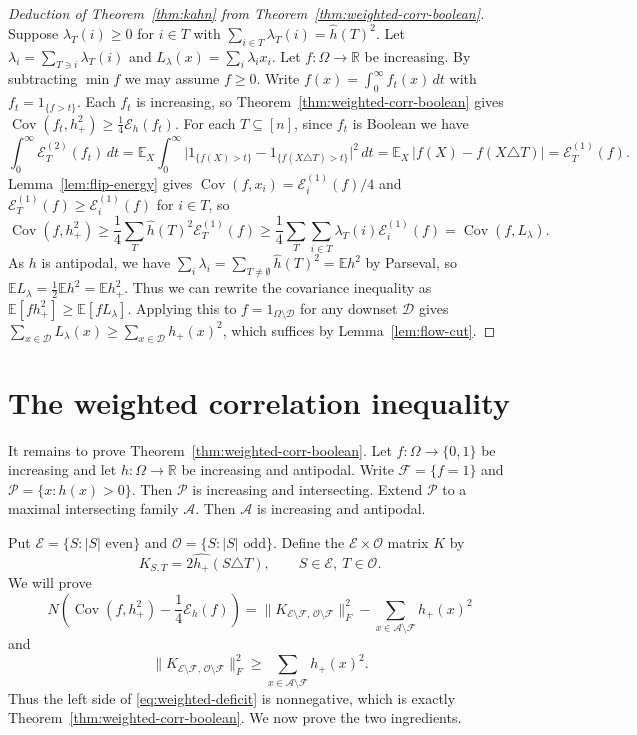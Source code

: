 \documentclass{article}
\theoremstyle{plain}
\theoremstyle{definition}
\newcommand{\mc}[1]{\mathcal{#1}}
\newcommand{\mb}[1]{\mathbb{#1}}
\newcommand{\sub}{\subseteq}
\newcommand{\sm}{\setminus}
\newcommand{\es}{\emptyset}
\newcommand{\cE}{\mathcal E}
\newcommand{\OO}{\Omega}
\newcommand{\on}{\operatorname}
\begin{document}
\begin{proof}[Deduction of Theorem~\ref{thm:kahn} from Theorem~\ref{thm:weighted-corr-boolean}]
Suppose $\lambda_T(i)\ge0$ for $i\in T$ with \(\sum_{i\in T}\lambda_T(i)=\widehat h(T)^2\).
Let $\lambda_i=\sum_{T\ni i}\lambda_T(i)$ and $L_\lambda(x)=\sum_i\lambda_i x_i$.
Let $f:\OO\to\mb R$ be increasing.  By subtracting $\min f$ we may assume $f\ge0$. Write $f(x)=\int_0^\infty f_t(x)\,dt$ with $f_t=1_{\{f>t\}}$.  
Each $f_t$ is increasing, so Theorem~\ref{thm:weighted-corr-boolean} gives $\on{Cov}(f_t,h_+^2)\ge\frac14\mc E_h(f_t)$.  
For each $T \sub [n]$, since $f_t$ is Boolean we have
\[  \int_0^\infty \cE_T^{(2)}(f_t)\,dt = \mb E_X\int_0^\infty
   \bigl|1_{\{f(X)>t\}}-1_{\{f(X\triangle T)>t\}}\bigr|^2\,dt
  =  \mb E_X\,|f(X)-f(X\triangle T)| =\cE_T^{(1)}(f). \]
  Lemma~\ref{lem:flip-energy} gives $\on{Cov}(f,x_i)=\cE_i^{(1)}(f)/4$ and $\cE_T^{(1)}(f)\ge\cE_i^{(1)}(f)$ for $i\in T$, so
\[
 \on{Cov}(f,h_+^2)
 \ge\frac14\sum_T\widehat h(T)^2\cE_T^{(1)}(f)
 \ge\frac14\sum_T\sum_{i\in T}\lambda_T(i)\cE_i^{(1)}(f)
 =\on{Cov}(f,L_\lambda).
\]
As $h$ is antipodal, we have $\sum_i\lambda_i =\sum_{T\ne\es}\widehat h(T)^2 =\mb E h^2$ by Parseval,
so $\mb E L_\lambda=\frac12\mb E h^2 = \mb E h_+^2$. Thus we can rewrite the covariance inequality 
as \(\mb E[f h_+^2]\ge\mb E[fL_\lambda].\)
Applying this to $f=1_{\OO\sm\mc D}$ for any downset $\mc D$
gives $\sum_{x\in\mc D}L_\lambda(x)\ge\sum_{x\in\mc D}h_+(x)^2$,
which suffices by Lemma~\ref{lem:flow-cut}.
\end{proof}

\section{The weighted correlation inequality}\label{sec:weighted-correlation}

It remains to prove Theorem~\ref{thm:weighted-corr-boolean}.  
Let $f:\OO\to\{0,1\}$ be increasing and let $h:\OO\to\mb R$ be increasing and antipodal.  
Write $\mc F=\{f=1\}$ and $\mc P=\{x:h(x)>0\}$. Then $\mc P$ is increasing and intersecting.
Extend $\mc P$ to a maximal intersecting family $\mc A$. Then $\mc A$ is increasing and antipodal.

Put $\mc E=\{S:|S|\text{ even}\}$ and $\mc O=\{S:|S|\text{ odd}\}$.  Define the $\mc E\times\mc O$ matrix $K$ by
\[
 K_{S,T}=2\widehat{h_+}(S\triangle T),\qquad S\in\mc E,\ T\in\mc O.
\]
We will prove
\begin{equation}\label{eq:weighted-deficit}
 N\left(\on{Cov}(f,h_+^2)-\frac14\mc E_h(f)\right)
 =\|K_{\mc E\sm\mc F,\,\mc O\sm\mc F}\|_F^2
 -\sum_{x\in\mc A\sm\mc F}h_+(x)^2
\end{equation}
and
\begin{equation}\label{eq:common-flag-bound}
 \|K_{\mc E\sm\mc F,\,\mc O\sm\mc F}\|_F^2
 \ge \sum_{x\in\mc A\sm\mc F}h_+(x)^2.
\end{equation}
Thus the left side of \eqref{eq:weighted-deficit} is nonnegative, which is exactly Theorem~\ref{thm:weighted-corr-boolean}.  We now prove the two ingredients.
\end{document}
